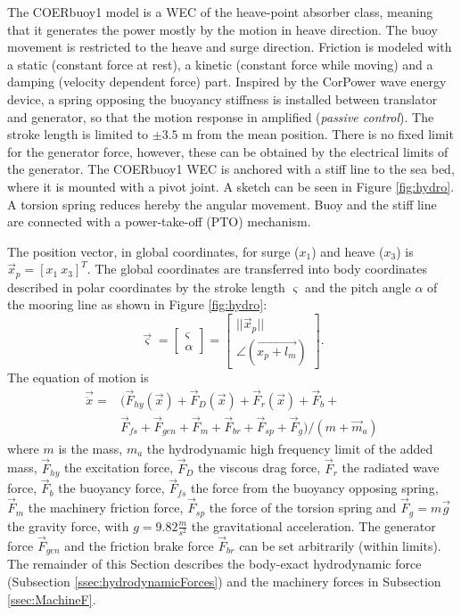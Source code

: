 \documentclass[oneside,10pt,a4paper]{book}
\begin{document}
The COERbuoy1 model is a WEC of the heave-point absorber class, meaning that it generates the power mostly by the motion in heave direction. The buoy movement is restricted to the heave and surge direction. Friction is modeled with a static (constant force at rest), a kinetic (constant force while moving) and a damping (velocity dependent force) part. Inspired by the CorPower wave energy device, a spring opposing the buoyancy stiffness is installed between translator and generator, so that the motion response in amplified (\textit{passive control}). The stroke length is limited to $\pm3.5$ m from the mean position. There is no fixed limit for the generator force, however, these can be obtained by the electrical limits of the generator.
The COERbuoy1 WEC is anchored with a stiff line to the sea bed, where it is mounted with a pivot joint. A sketch can be seen in Figure \ref{fig:hydro}. A torsion spring reduces hereby the angular movement.
Buoy and the stiff line are connected with a power-take-off (PTO) mechanism.


The position vector, in global coordinates, for surge ($x_1$) and heave ($x_3$) is $\vec{x}_p=[x_1\:x_3]^T$. The global coordinates are transferred into body coordinates described in polar coordinates by the stroke length $\varsigma$ and the pitch angle $\alpha$ of the mooring line as shown in Figure \ref{fig:hydro}:
\begin{equation}
	\vec{\varsigma}=\begin{bmatrix}
		\varsigma\\ \alpha
	\end{bmatrix}
	=
	\begin{bmatrix}
		||\vec{x}_p ||\\ \angle(\vec{x_p+l_m})
	\end{bmatrix}\text{.}
\end{equation}
The equation of motion is
\begin{equation}
	\begin{split}
		\vec{\ddot{x}}=&(\vec{F}_{hy}(\vec{x})+\vec{F}_{D}(\vec{x})+\vec{F}_{r}(\vec{x})+\vec{F}_{b}+\\
		&\vec{F}_{fs}+\vec{F}_{gen}+\vec{F}_{m}+\vec{F}_{br}+\vec{F}_{sp}+\vec{F}_{g})/(m+\vec{m}_a)
	\end{split}
\end{equation}
where $m$ is the mass, $m_a$ the hydrodynamic high frequency limit of the added mass, $\vec{F}_{hy}$ the excitation force, $\vec{F}_{D}$ the viscous drag force, $\vec{F}_{r}$ the radiated wave force, $\vec{F}_{b}$ the buoyancy force, $\vec{F}_{fs}$ the force from the buoyancy opposing spring, $\vec{F}_{m}$ the machinery friction force, $\vec{F}_{sp}$ the force of the torsion spring and $\vec{F}_{g}=m \vec{g}$ the gravity force, with $g=9.82 \frac{m}{s^2}$ the gravitational acceleration. The generator force $\vec{F}_{gen}$ and the friction brake force $\vec{F}_{br}$ can be set arbitrarily (within limits).
The remainder of this Section describes the body-exact hydrodynamic force (Subsection \ref{ssec:hydrodynamicForces}) and the machinery forces in Subsection \ref{ssec:MachineF}.
\end{document}
